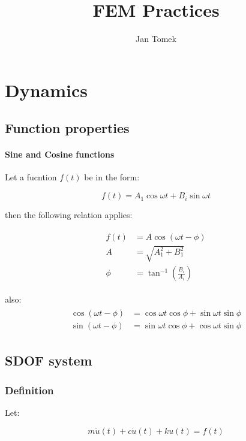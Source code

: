 \documentclass[10pt,b5paper,titlepage]{book}
\author{Jan Tomek}
\title{\bf FEM Practices}
\newenvironment{ematrix}
{
    \begin{eqnarray}
        \begin{aligned}
}
{
        \end{aligned}
    \end{eqnarray}
}
\begin{document}
\maketitle

\tableofcontents

\chapter{Dynamics}

\section{Function properties}

\subsubsection{Sine and Cosine functions}
Let a fucntion $ f(t) $ be in the form:

\begin{equation}
    f(t) = A_1 \cos{\omega t} + B_i \sin{\omega t}
\end{equation}

then the following relation applies:

\begin{ematrix}
    f(t) &= A \cos{\left( \omega t - \phi \right)}\\
    A &= \sqrt{A_1^2 + B_1^2}\\
    \phi &= \tan^{-1} \left( \frac{B_i}{A_i} \right)
\end{ematrix}

also:
\begin{ematrix}
    \cos{\left( \omega t - \phi \right)} &=
    \cos{\omega t} \cos{\phi} + \sin{\omega t} \sin{\phi}\\
    \sin{\left( \omega t - \phi \right)} &=
    \sin{\omega t} \cos{\phi} + \cos{\omega t} \sin{\phi}
\end{ematrix}



\section{SDOF system}

\subsection{Definition}

Let:

\begin{equation}
    m \ddot{u}(t) + c \dot{u}(t) + k u(t) = f(t)
\end{equation}
\end{document}

